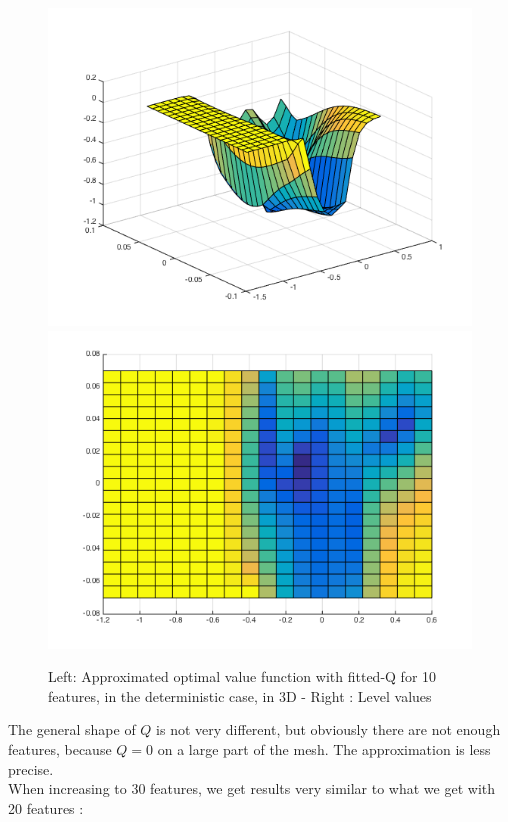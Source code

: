 \documentclass[a4paper, 12pt]{article}
\begin{document}
\begin{figure}[H]
	\centering
	\noindent\includegraphics[scale=0.3]{fittedQ-10feat-determ.png}
	\noindent\includegraphics[scale=0.3]{fittedQ-10feat-determ-flat.png}
	\caption{Left: Approximated optimal value function with fitted-Q for 10 features, in the deterministic case, in 3D - Right : Level values}
\end{figure}

The general shape of $Q$ is not very different, but obviously there are not enough features, because $Q=0$ on a large part of the mesh. The approximation is less precise.
\\When increasing to 30 features, we get results very similar to what we get with 20 features :
\end{document}
